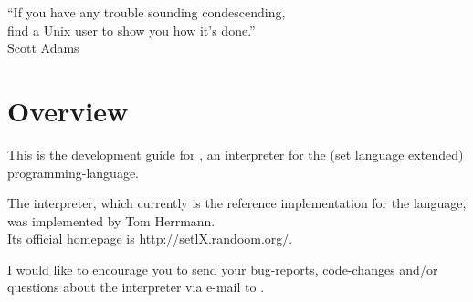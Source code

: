 


\globalDate{\today}
\globalKeywords{}







\begin{titlepage}
\maketitle

\vfill

\begin{center}
\Large
``If you have any trouble sounding condescending,\\
find a Unix user to show you how it's done.''\\
Scott Adams
\end{center}

\vfill
\end{titlepage}

\tableofcontents

\newpage

\section{Overview}

This is the development guide for \setlX, an interpreter for the \SetlX{} (\underline{set} \underline{l}anguage e\underline{x}tended) programming-language.

The \setlX{} interpreter, which currently is the reference implementation for the \SetlX{} language, was implemented by Tom Herrmann.\\
Its official homepage is \url{http://setlX.randoom.org/}.

I would like to encourage you to send your bug-reports, code-changes and\slash{}or questions about the \setlX{} interpreter via e-mail to .

